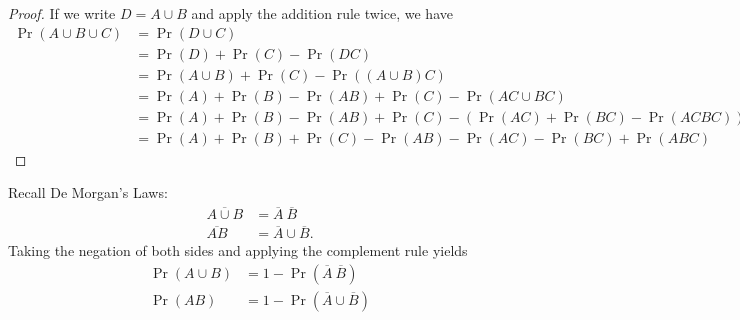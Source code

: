 \documentclass{article}
\begin{document}
\begin{proof}
    If we write \(D = A \cup B\) and apply the addition rule twice, we have
    \begin{align*}
        \Pr{\left( A \cup B \cup C \right)} & = \Pr{\left( D \cup C \right)}                                                                                                                                                               \\
                                            & = \Pr{\left( D \right)} + \Pr{\left( C \right)} - \Pr{\left( DC \right)}                                                                                                                     \\
                                            & = \Pr{\left( A \cup B \right)} + \Pr{\left( C \right)} - \Pr{\left( \left( A \cup B \right)C \right)}                                                                                        \\
                                            & = \Pr{\left( A \right)} + \Pr{\left( B \right)} - \Pr{\left( AB \right)} + \Pr{\left( C \right)} - \Pr{\left( AC \cup BC \right)}                                                            \\
                                            & = \Pr{\left( A \right)} + \Pr{\left( B \right)} - \Pr{\left( AB \right)} + \Pr{\left( C \right)} - \left( \Pr{\left( AC \right)} + \Pr{\left( BC \right)} - \Pr{\left( ACBC \right)} \right) \\
                                            & = \Pr{\left( A \right)} + \Pr{\left( B \right)} + \Pr{\left( C \right)} - \Pr{\left( AB \right)} - \Pr{\left( AC \right)} - \Pr{\left( BC \right)} + \Pr{\left( ABC \right)}
    \end{align*}
\end{proof}
\begin{theorem}
    Recall De Morgan's Laws:
    \begin{align*}
        \overline{A \cup B} & = \overline{A} \ \overline{B}     \\
        \overline{AB}       & = \overline{A} \cup \overline{B}.
    \end{align*}
    Taking the negation of both sides and applying the complement rule yields
    \begin{align*}
        \Pr{\left( A \cup B \right)} & = 1 - \Pr{\left( \overline{A} \ \overline{B} \right)}    \\
        \Pr{\left( AB \right)}       & = 1 - \Pr{\left( \overline{A} \cup \overline{B} \right)}
    \end{align*}
\end{theorem}
\end{document}
